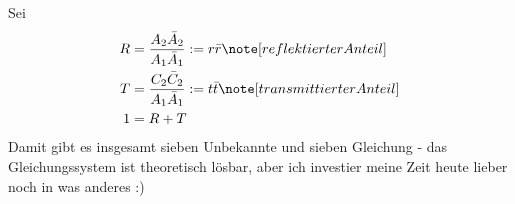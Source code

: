 \documentclass[ex]{exercise_3.0}
\begin{document}
Sei 
\begin{align*}
    R &=\frac{A_2 \bar A_2}{A_1 \bar A_1}:=r\bar r \note[reflektierter Anteil]\\
    T &=\frac{C_2\bar C_2}{A_1 \bar A_1} :=t\bar t\note[transmittierter Anteil]\\
    1 &= R+T
\end{align*}
Damit gibt es insgesamt sieben Unbekannte und sieben Gleichung - das Gleichungssystem ist 
theoretisch lösbar, aber ich investier meine Zeit heute lieber noch in was anderes :)
\end{document}
